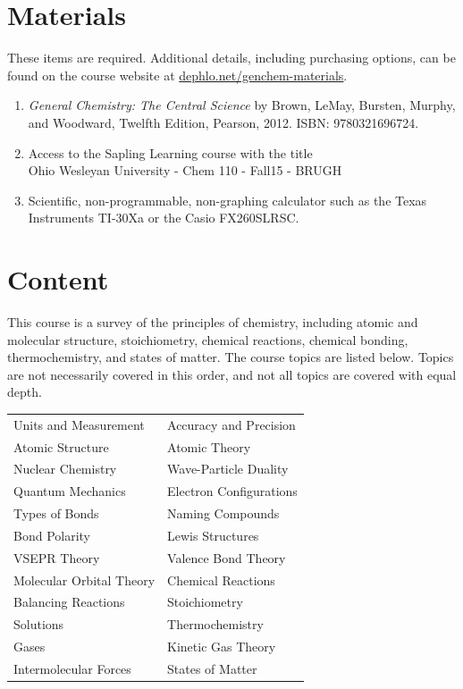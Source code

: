 \documentclass[letterpaper,oneside,onecolumn,11pt,article]{memoir}
\begin{document}
\section{Materials}
These items are required. Additional details, including purchasing options, can be found on the course website at \href{http://dephlo.net/genchem-materials}{dephlo.net/genchem-materials}.
\begin{enumerate}
\item \textit{General Chemistry: The Central Science} by Brown, LeMay, Bursten, Murphy, and Woodward, Twelfth Edition, Pearson, 2012. ISBN: 9780321696724. 
\item Access to the Sapling Learning course with the title \\ Ohio Wesleyan University - Chem 110 - Fall15 - BRUGH
\item Scientific, non-programmable, non-graphing calculator such as the Texas Instruments TI-30Xa or the  Casio FX260SLRSC.
\end{enumerate}
%
%
\section{Content}
This course is a survey of the principles of chemistry, including atomic and molecular structure, stoichiometry, chemical reactions, chemical bonding, thermochemistry, and states of matter. The course topics are listed below. Topics are not necessarily covered in this order, and not all topics are covered with equal depth.

\begin{table}[h]
\renewcommand{\arraystretch}{1}
\begin{tabular}{l|l} \toprule
Units and Measurement & Accuracy and Precision \\
Atomic Structure & Atomic Theory \\
Nuclear Chemistry &  Wave-Particle Duality \\
Quantum Mechanics &  Electron Configurations \\
Types of Bonds & Naming Compounds \\
Bond Polarity & Lewis Structures \\
VSEPR Theory & Valence Bond Theory \\
Molecular Orbital Theory & Chemical Reactions \\
Balancing Reactions & Stoichiometry \\
Solutions & Thermochemistry \\
Gases & Kinetic Gas Theory \\
Intermolecular Forces & States of Matter \\
\bottomrule
\end{tabular}
\end{table}
%
%
\end{document}
